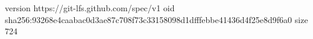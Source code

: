 version https://git-lfs.github.com/spec/v1
oid sha256:93268e4caabac0d3ae87c708f73c33158098d1dfffebbe41436d4f25e8d9f6a0
size 724
